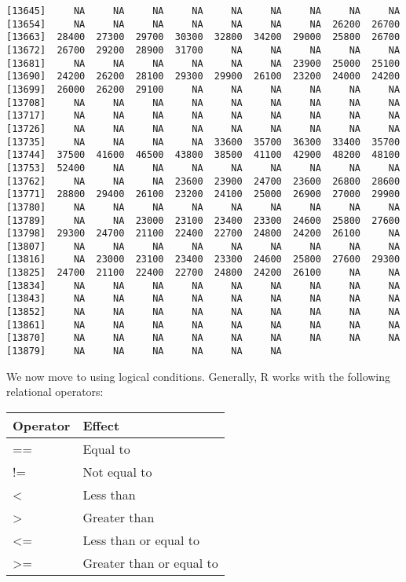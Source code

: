 \documentclass[]{article}
\begin{document}
\begin{verbatim}
[13645]     NA     NA     NA     NA     NA     NA     NA     NA     NA
[13654]     NA     NA     NA     NA     NA     NA     NA  26200  26700
[13663]  28400  27300  29700  30300  32800  34200  29000  25800  26700
[13672]  26700  29200  28900  31700     NA     NA     NA     NA     NA
[13681]     NA     NA     NA     NA     NA     NA  23900  25000  25100
[13690]  24200  26200  28100  29300  29900  26100  23200  24000  24200
[13699]  26000  26200  29100     NA     NA     NA     NA     NA     NA
[13708]     NA     NA     NA     NA     NA     NA     NA     NA     NA
[13717]     NA     NA     NA     NA     NA     NA     NA     NA     NA
[13726]     NA     NA     NA     NA     NA     NA     NA     NA     NA
[13735]     NA     NA     NA     NA  33600  35700  36300  33400  35700
[13744]  37500  41600  46500  43800  38500  41100  42900  48200  48100
[13753]  52400     NA     NA     NA     NA     NA     NA     NA     NA
[13762]     NA     NA     NA  23600  23900  24700  23600  26800  28600
[13771]  28800  29400  26100  23200  24100  25000  26900  27000  29900
[13780]     NA     NA     NA     NA     NA     NA     NA     NA     NA
[13789]     NA     NA  23000  23100  23400  23300  24600  25800  27600
[13798]  29300  24700  21100  22400  22700  24800  24200  26100     NA
[13807]     NA     NA     NA     NA     NA     NA     NA     NA     NA
[13816]     NA  23000  23100  23400  23300  24600  25800  27600  29300
[13825]  24700  21100  22400  22700  24800  24200  26100     NA     NA
[13834]     NA     NA     NA     NA     NA     NA     NA     NA     NA
[13843]     NA     NA     NA     NA     NA     NA     NA     NA     NA
[13852]     NA     NA     NA     NA     NA     NA     NA     NA     NA
[13861]     NA     NA     NA     NA     NA     NA     NA     NA     NA
[13870]     NA     NA     NA     NA     NA     NA     NA     NA     NA
[13879]     NA     NA     NA     NA     NA     NA
\end{verbatim}

We now move to using logical conditions. Generally, R works with the following relational operators:

\begin{tabular}{l|l}
\hline
Operator & Effect\\
\hline
== & Equal to\\
\hline
!= & Not equal to\\
\hline
< & Less than\\
\hline
> & Greater than\\
\hline
<= & Less than or equal to\\
\hline
>= & Greater than or equal to\\
\hline
\end{tabular}
\end{document}
